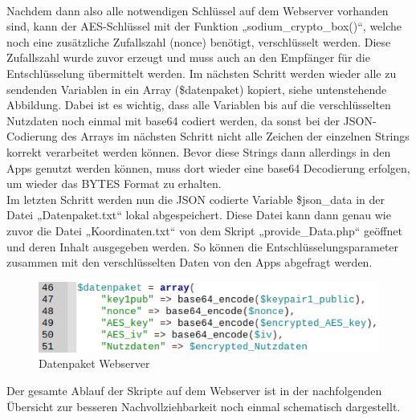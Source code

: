 \\
Nachdem dann also alle notwendigen Schlüssel auf dem Webserver vorhanden sind, kann der AES-Schlüssel mit der Funktion „sodium\_crypto\_box()“, welche noch eine zusätzliche Zufallszahl (nonce) benötigt, verschlüsselt werden. Diese Zufallszahl wurde zuvor erzeugt und muss auch an den Empfänger für die Entschlüsselung übermittelt werden. Im nächsten Schritt werden wieder alle zu sendenden Variablen in ein Array (\$datenpaket) kopiert, siehe untenstehende Abbildung. Dabei ist es wichtig, dass alle Variablen bis auf die verschlüsselten Nutzdaten noch einmal mit base64 codiert werden, da sonst bei der JSON-Codierung des Arrays im nächsten Schritt nicht alle Zeichen der einzelnen Strings korrekt verarbeitet werden können. Bevor diese Strings dann allerdings in den Apps genutzt werden können, muss dort wieder eine base64 Decodierung erfolgen, um wieder das BYTES Format zu erhalten.
\\
Im letzten Schritt werden nun die JSON codierte Variable \$json\_data in der Datei „Datenpaket.txt“ lokal abgespeichert. Diese Datei kann dann genau wie zuvor die Datei „Koordinaten.txt“ von dem Skript „provide\_Data.php“ geöffnet und deren Inhalt ausgegeben werden. So können die Entschlüsselungsparameter zusammen mit den verschlüsselten Daten von den Apps abgefragt werden.
\begin{figure} [H]
	\begin{center}
		\includegraphics[width=1\textwidth]{Bilder/Webserver_verschluesslung.png}
		\caption{Datenpaket Webserver}
		\label{server-dp}
	\end{center}
\end{figure}
Der gesamte Ablauf der Skripte auf dem Webserver ist in der nachfolgenden Übersicht zur besseren Nachvollziehbarkeit noch einmal schematisch dargestellt.

